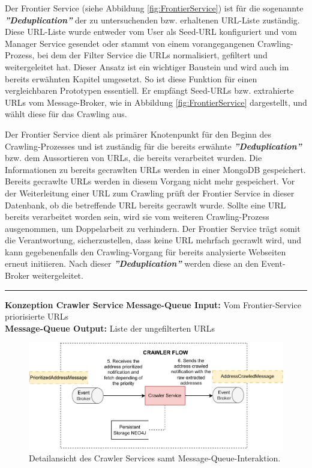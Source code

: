 Der Frontier Service (siehe Abbildung \ref{fig:FrontierService}) ist für die sogenannte \textbf{\textit{''Deduplication''}} der zu untersuchenden bzw. erhaltenen URL-Liste zuständig. Diese URL-Liste wurde entweder vom User als Seed-URL konfiguriert und vom Manager Service gesendet oder stammt von einem vorangegangenen Crawling-Prozess, bei dem der Filter Service die URLs normalisiert, gefiltert und weitergeleitet hat. Dieser Ansatz ist ein wichtiger Baustein und wird auch im bereits erwähnten Kapitel \textit{} umgesetzt. So ist diese Funktion für einen vergleichbaren Prototypen essentiell. Er empfängt Seed-URLs bzw. extrahierte URLs vom Message-Broker, wie in Abbildung \ref{fig:FrontierService} dargestellt, und wählt diese für das Crawling aus. 

Der Frontier Service dient als primärer Knotenpunkt für den Beginn des Crawling-Prozesses und ist zuständig für die bereits erwähnte \textbf{\textit{''Deduplication''}} bzw. dem Aussortieren von URLs, die bereits verarbeitet wurden. Die Informationen zu bereits gecrawlten URLs werden in einer MongoDB gespeichert. Bereits gecrawlte URLs werden in diesem Vorgang nicht mehr gespeichert. Vor der Weiterleitung einer URL zum Crawling prüft der Frontier Service in dieser Datenbank, ob die betreffende URL bereits gecrawlt wurde. Sollte eine URL bereits verarbeitet worden sein, wird sie vom weiteren Crawling-Prozess ausgenommen, um Doppelarbeit zu verhindern. Der Frontier Service trägt somit die Verantwortung, sicherzustellen, dass keine URL mehrfach gecrawlt wird, und kann gegebenenfalls den Crawling-Vorgang für bereits analysierte Webseiten erneut initiieren. Nach dieser \textbf{\textit{''Deduplication''}} werden diese an den Event-Broker weitergeleitet.

\noindent\rule{\textwidth}{1pt}

\textbf{Konzeption Crawler Service}
\newline
\textbf{Message-Queue Input:} Vom Frontier-Service priorisierte URLs \\
\textbf{Message-Queue Output:} Liste der ungefilterten URLs

\begin{figure}[H]
    \centering
    \includegraphics[width=14cm]{images/40_concept/CrawlerService.drawio.pdf}
    \caption[Detailansicht des Crawler Services]{Detailansicht des Crawler Services samt Message-Queue-Interaktion.}
    \label{fig:CrawlerService}
\end{figure}

